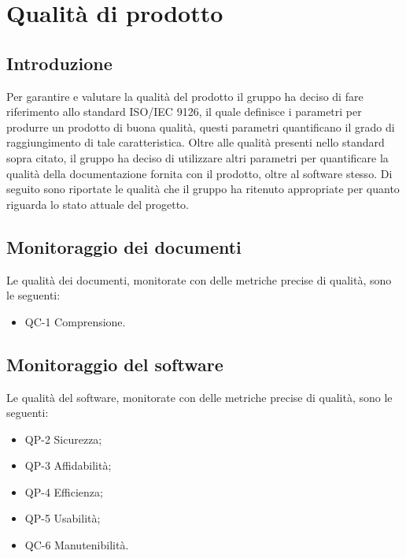 \section{Qualità di prodotto}

\subsection{Introduzione}
	Per garantire e valutare la qualità del prodotto il gruppo ha deciso di fare riferimento allo standard ISO/IEC 9126, il quale definisce i parametri per produrre un prodotto di buona qualità, questi parametri quantificano il grado di raggiungimento di tale caratteristica.
	\newline
	Oltre alle qualità presenti nello standard sopra citato, il gruppo ha deciso di utilizzare altri parametri per quantificare la qualità della documentazione fornita con il prodotto, oltre al software stesso.
	\newline
	Di seguito sono riportate le qualità che il gruppo ha ritenuto appropriate per quanto riguarda lo stato attuale del progetto.
	
	
\subsection{Monitoraggio dei documenti}
	Le qualità dei documenti, monitorate con delle metriche precise di qualità, sono le seguenti:
	
	\begin{itemize}
		\item QC-1 Comprensione.
	\end{itemize}

	
	
\subsection{Monitoraggio del software}
	Le qualità del software, monitorate con delle metriche precise di qualità, sono le seguenti:
	
	\begin{itemize}
		\item QP-2 Sicurezza;
		\item QP-3 Affidabilità;
		\item QP-4 Efficienza;
		\item QP-5 Usabilità;
		\item QC-6 Manutenibilità.
	\end{itemize}

	
	
	
	
	
